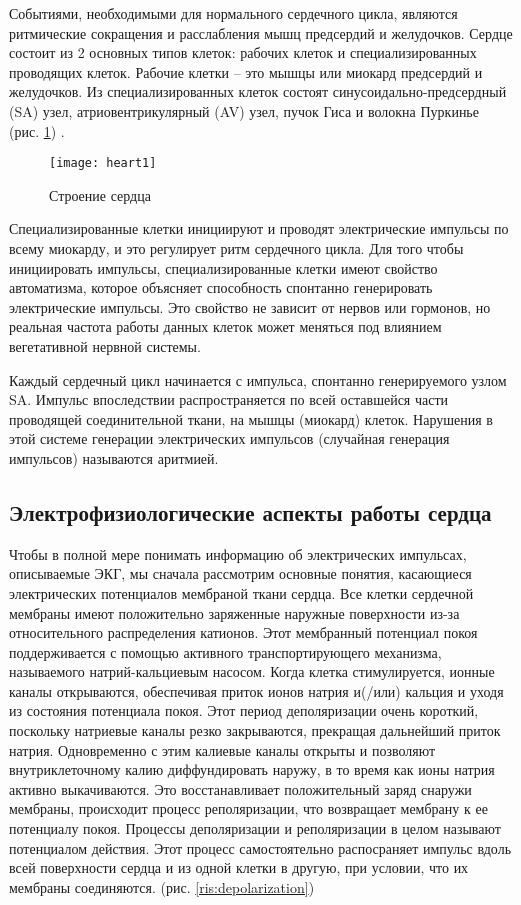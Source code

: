 Событиями, необходимыми для нормального сердечного цикла, являются ритмические сокращения и расслабления мышц предсердий и желудочков. Сердце состоит из 2 основных типов клеток: рабочих клеток и специализированных проводящих клеток. Рабочие клетки -- это мышцы или миокард предсердий и желудочков. Из специализированных клеток  состоят синусоидально-предсердный (SA) узел, атриовентрикулярный (AV) узел, пучок Гиса и волокна Пуркинье (рис. \ref{ris:heart1}) \cite{heart_stracture}.
\begin{figure}[h]
	\begin{center}
		\texttt{[image: heart1]}
		\caption{Строение сердца}
		\label{ris:heart1}
	\end{center}
\end{figure}

Специализированные клетки инициируют и проводят электрические импульсы по всему миокарду, и это регулирует ритм сердечного цикла. Для того чтобы инициировать импульсы, специализированные клетки имеют свойство автоматизма, которое объясняет способность спонтанно генерировать электрические импульсы. Это свойство не зависит от нервов или гормонов, но реальная частота работы данных клеток может меняться под влиянием вегетативной нервной системы.

Каждый сердечный цикл начинается с импульса, спонтанно генерируемого узлом SA. Импульс впоследствии распространяется по всей оставшейся части проводящей соединительной ткани, на мышцы (миокард) клеток. Нарушения в этой системе генерации электрических импульсов (случайная генерация импульсов) называются аритмией.

\subsection{Электрофизиологические аспекты работы сердца}

Чтобы в полной мере понимать информацию об электрических импульсах, описываемые ЭКГ, мы сначала рассмотрим основные понятия, касающиеся электрических потенциалов мембраной ткани сердца. Все клетки сердечной мембраны имеют положительно заряженные наружные поверхности из-за относительного распределения катионов. Этот мембранный потенциал покоя поддерживается с помощью активного транспортирующего механизма, называемого натрий-кальциевым насосом. Когда клетка стимулируется, ионные каналы открываются, обеспечивая приток ионов натрия и(/или) кальция и уходя из состояния потенциала покоя. Этот период деполяризации очень короткий, поскольку натриевые каналы резко закрываются, прекращая дальнейший приток натрия. Одновременно с этим калиевые каналы открыты и позволяют внутриклеточному калию диффундировать наружу, в то время как ионы натрия активно выкачиваются. Это восстанавливает положительный заряд снаружи мембраны, происходит процесс реполяризации, что возвращает мембрану к ее потенциалу покоя. Процессы деполяризации и реполяризации в целом называют потенциалом действия. Этот процесс самостоятельно распосраняет импульс вдоль всей поверхности сердца и из одной клетки в другую, при условии, что их мембраны соединяются. (рис. \ref{ris:depolarization}) 

